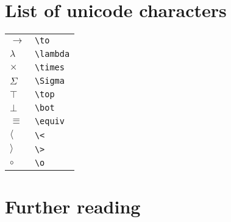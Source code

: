 \documentclass[a4paper,UKenglish]{tufte-handout}
\theoremstyle{definition}
\begin{document}
\appendix

\section{List of unicode characters}

\begin{tabular}{ll}
$\to$& \texttt{\textbackslash{}to} \\
$\lambda$& \texttt{\textbackslash{}lambda} \\
$\times$& \texttt{\textbackslash{}times} \\
$\Sigma$& \texttt{\textbackslash{}Sigma} \\
$\top$& \texttt{\textbackslash{}top} \\
$\bot$& \texttt{\textbackslash{}bot} \\
$\equiv$& \texttt{\textbackslash{}equiv} \\
$\langle$& \texttt{\textbackslash{}<} \\
$\rangle$& \texttt{\textbackslash{}>} \\
$\circ$& \texttt{\textbackslash{}o} \\
\end{tabular}

\section{Further reading}
\end{document}
